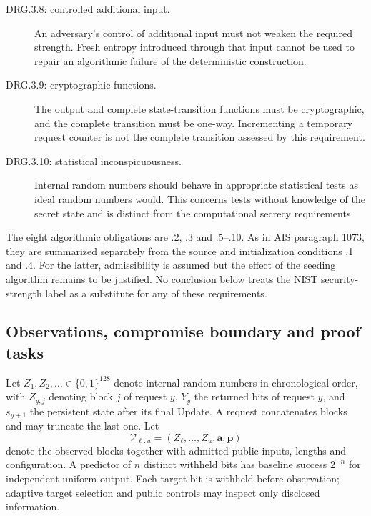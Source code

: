 \documentclass[journal=tosc,preprint,floatrow,nohyperxmp]{iacrtrans}
\numberwithin{lemma}{section}
\numberwithin{proposition}{section}
\newcommand{\bits}{\{0,1\}}
\numberwithin{equation}{section}
\theoremstyle{definition}
\numberwithin{definition}{section}
\theoremstyle{plain}
\begin{document}
\begin{description}
\item[DRG.3.8: controlled additional input.]
An adversary's control of additional input must not weaken the required strength. Fresh entropy introduced through that input cannot be used to repair an algorithmic failure of the deterministic construction.
\item[DRG.3.9: cryptographic functions.]
The output and complete state-transition functions must be cryptographic, and the complete transition must be one-way. Incrementing a temporary request counter is not the complete transition assessed by this requirement.
\item[DRG.3.10: statistical inconspicuousness.]
Internal random numbers should behave in appropriate statistical tests as ideal random numbers would. This concerns tests without knowledge of the secret state and is distinct from the computational secrecy requirements.
\end{description}

The eight algorithmic obligations are .2, .3 and .5--.10. As in AIS paragraph 1073, they are summarized separately from the source and initialization conditions .1 and .4. For the latter, admissibility is assumed but the effect of the seeding algorithm remains to be justified. No conclusion below treats the NIST security-strength label as a substitute for any of these requirements.

\subsection{Observations, compromise boundary and proof tasks}
Let $Z_1,Z_2,\ldots\in\bits^{128}$ denote internal random numbers in chronological order, with $Z_{y,j}$ denoting block $j$ of request $y$, $Y_y$ the returned bits of request $y$, and $s_{y+1}$ the persistent state after its final Update. A request concatenates blocks and may truncate the last one. Let
\[
 \mathcal V_{\ell:u}=(Z_\ell,\ldots,Z_u,\mathbf a,\mathbf p)
\]
denote the observed blocks together with admitted public inputs, lengths and configuration. A predictor of $n$ distinct withheld bits has baseline success $2^{-n}$ for independent uniform output. Each target bit is withheld before observation; adaptive target selection and public controls may inspect only disclosed information.
\end{document}
